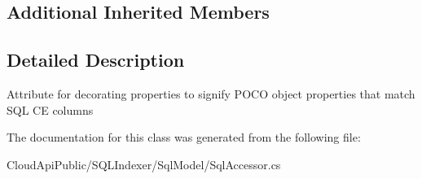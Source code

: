 \subsection*{Additional Inherited Members}


\subsection{Detailed Description}
Attribute for decorating properties to signify P\-O\-C\-O object properties that match S\-Q\-L C\-E columns 



The documentation for this class was generated from the following file\-:\begin{DoxyCompactItemize}
\item 
Cloud\-Api\-Public/\-S\-Q\-L\-Indexer/\-Sql\-Model/Sql\-Accessor.\-cs\end{DoxyCompactItemize}
